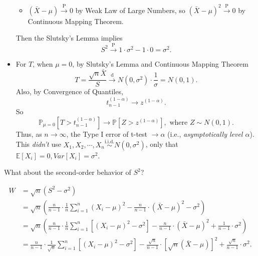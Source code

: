 \documentclass[a4paper]{article}
\begin{document}
\begin{eg}
\begin{itemize}[leftmargin=*]
\begin{itemize}
			\item $(\bar{X} - \mu) \stackrel{\text{P}}{\longrightarrow} 0$ by Weak Law of Large Numbers, so $(\bar{X} - \mu)^2 \stackrel{\text{P}}{\longrightarrow} 0$ by Continuous Mapping Theorem.
		\end{itemize}
		Then the Slutsky's Lemma implies
		\begin{equation}
			S^2 \stackrel{\text{P}}{\longrightarrow} 1 \cdot \sigma^2 - 1 \cdot 0 = \sigma^2.
		\end{equation}
		\item For $T $, when $\mu = 0$, by Slutsky's Lemma and  Continuous Mapping Theorem
		\begin{equation}
			T= \frac{\sqrt{n}\bar{X}}{S} \stackrel{\text{d}}{\longrightarrow} N(0,\sigma^2) \cdot \frac{1}{\sigma} = N(0,1).
		\end{equation}
		Also, by Convergence of Quantiles,
		\begin{equation}
			t_{n-1}^{(1-\alpha)} \to z^{(1-\alpha)}.
		\end{equation}
		So
		\begin{equation}
			\mathbb{P}_{\mu = 0}[T > t_{n-1}^{(1-\alpha)}] \to \mathbb{P}[Z > z^{(1-\alpha)}], \text{ where } Z \sim N(0,1).
		\end{equation}
		Thus, as $n \to \infty$, the Type I error of t-test $\to \alpha$ (i.e., \emph{asymptotically level $\alpha$}). This \emph{didn't} use $X_1,X_2, \cdots, X_n \stackrel{\text{i.i.d.}}{\sim} N(0,\sigma^2)$, only that $\mathbb{E}[X_i] = 0, Var[X_i] = \sigma^2$.
	\end{itemize}
	\newpage
	\begin{question}
		What about the second-order behavior of $S^2$?
	\end{question}
	\begin{answer}
		\begin{equation}
			\begin{aligned}
				W &= \sqrt{n}(S^2 - \sigma^2) \\
				&= \sqrt{n}\left(\frac{n}{n-1} \cdot \frac{1}{n} \sum\limits_{i=1}^n(X_i-\mu)^2 - \frac{n}{n-1} \cdot (\bar{X} - \mu)^2 - \sigma^2\right) \\
				&= \sqrt{n}\left(\frac{n}{n-1} \cdot \frac{1}{n} \sum\limits_{i=1}^n [(X_i-\mu)^2 - \sigma^2] - \frac{n}{n-1} \cdot (\bar{X} - \mu)^2 + \frac{1}{n-1} \cdot \sigma^2\right) \\
				&= \frac{n}{n-1} \cdot \frac{1}{\sqrt{n}} \sum\limits_{i=1}^n \left[(X_i-\mu)^2 - \sigma^2\right] - \frac{\sqrt{n}}{n-1} \cdot [\sqrt{n}(\bar{X} - \mu)]^2 + \frac{\sqrt{n}}{n-1} \cdot \sigma^2.

\end{aligned}
\end{equation}
\end{answer}
\end{eg}
\end{document}
